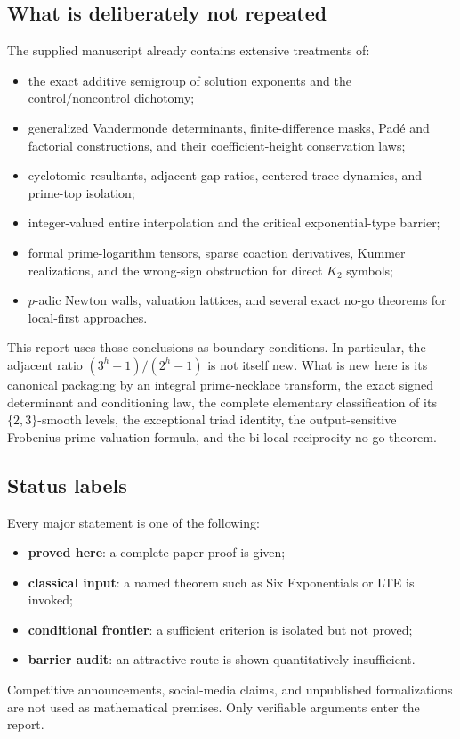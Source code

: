 \documentclass[11pt]{article}
\numberwithin{equation}{section}
\theoremstyle{definition}
\theoremstyle{remark}
\begin{document}
\subsection{What is deliberately not repeated}

The supplied manuscript already contains extensive treatments of:
\begin{itemize}
  \item the exact additive semigroup of solution exponents and the control/noncontrol dichotomy;
  \item generalized Vandermonde determinants, finite-difference masks, Pad\'e and factorial constructions, and their coefficient-height conservation laws;
  \item cyclotomic resultants, adjacent-gap ratios, centered trace dynamics, and prime-top isolation;
  \item integer-valued entire interpolation and the critical exponential-type barrier;
  \item formal prime-logarithm tensors, sparse coaction derivatives, Kummer realizations, and the wrong-sign obstruction for direct $K_2$ symbols;
  \item $p$-adic Newton walls, valuation lattices, and several exact no-go theorems for local-first approaches.
\end{itemize}
This report uses those conclusions as boundary conditions.  In particular, the adjacent ratio $(3^h-1)/(2^h-1)$ is not itself new.  What is new here is its canonical packaging by an integral prime-necklace transform, the exact signed determinant and conditioning law, the complete elementary classification of its $\{2,3\}$-smooth levels, the exceptional triad identity, the output-sensitive Frobenius-prime valuation formula, and the bi-local reciprocity no-go theorem.

\subsection{Status labels}

Every major statement is one of the following:
\begin{itemize}
  \item \textbf{proved here}: a complete paper proof is given;
  \item \textbf{classical input}: a named theorem such as Six Exponentials or LTE is invoked;
  \item \textbf{conditional frontier}: a sufficient criterion is isolated but not proved;
  \item \textbf{barrier audit}: an attractive route is shown quantitatively insufficient.
\end{itemize}
Competitive announcements, social-media claims, and unpublished formalizations are not used as mathematical premises.  Only verifiable arguments enter the report.
\end{document}
